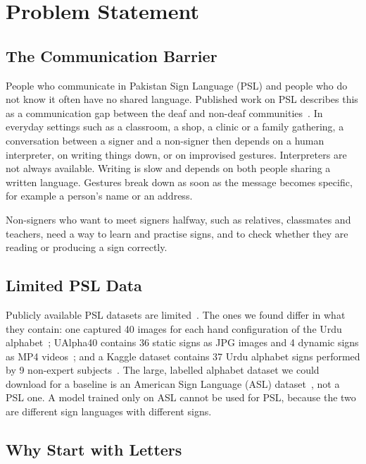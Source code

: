 \section{Problem Statement}
\label{sec:problem}

\subsection{The Communication Barrier}

People who communicate in Pakistan Sign Language (PSL) and people who do not know it often have no shared language. Published work on PSL describes this as a communication gap between the deaf and non-deaf communities~\cite{imran2021psl}. In everyday settings such as a classroom, a shop, a clinic or a family gathering, a conversation between a signer and a non-signer then depends on a human interpreter, on writing things down, or on improvised gestures. Interpreters are not always available. Writing is slow and depends on both people sharing a written language. Gestures break down as soon as the message becomes specific, for example a person's name or an address.

Non-signers who want to meet signers halfway, such as relatives, classmates and teachers, need a way to learn and practise signs, and to check whether they are reading or producing a sign correctly.

\subsection{Limited PSL Data}

Publicly available PSL datasets are limited~\cite{colorglove_psl}. The ones we found differ in what they contain: one captured 40 images for each hand configuration of the Urdu alphabet~\cite{imran2021psl}; UAlpha40 contains 36 static signs as JPG images and 4 dynamic signs as MP4 videos~\cite{sajid2025ualpha40}; and a Kaggle dataset contains 37 Urdu alphabet signs performed by 9 non-expert subjects~\cite{butt_psl_kaggle}. The large, labelled alphabet dataset we could download for a baseline is an American Sign Language (ASL) dataset~\cite{asl_alphabet_kaggle}, not a PSL one. A model trained only on ASL cannot be used for PSL, because the two are different sign languages with different signs.

\subsection{Why Start with Letters}

